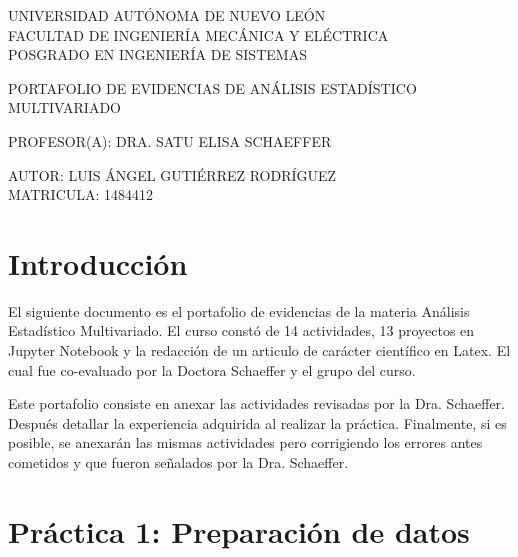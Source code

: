 \documentclass[12pt, letter]{report}
\begin{document}
	
\begin{titlepage}	
	\begin{center}
		\huge UNIVERSIDAD AUTÓNOMA DE NUEVO LEÓN\\
		\bigskip
		\bigskip
		FACULTAD DE INGENIERÍA MECÁNICA Y ELÉCTRICA\\
		\bigskip
		\bigskip
		POSGRADO EN INGENIERÍA DE SISTEMAS\\
		\bigskip
		\bigskip
		\bigskip
		\bigskip
		\begin{Large}
			PORTAFOLIO DE EVIDENCIAS DE ANÁLISIS ESTADÍSTICO MULTIVARIADO\\
		\end{Large}
		\bigskip
		\bigskip
		\begin{large}
		\bigskip
			PROFESOR(A): DRA. SATU ELISA SCHAEFFER\\
		\bigskip
		\end{large}
		\bigskip
		\bigskip
		\bigskip
		\begin{large}
			AUTOR: LUIS ÁNGEL GUTIÉRREZ RODRÍGUEZ\\
			MATRICULA: 1484412\\
		\end{large}
	\end{center}	
\end{titlepage}	





\chapter*{Introducción}

El siguiente documento es el portafolio de evidencias de la materia Análisis Estadístico Multivariado. El curso constó de 14 actividades, 13 proyectos en Jupyter Notebook y la redacción de un articulo de carácter científico en Latex. El cual fue co-evaluado por la Doctora Schaeffer y el grupo del curso.

Este portafolio consiste en anexar las actividades revisadas por la Dra. Schaeffer. Después detallar la experiencia adquirida al realizar la práctica. Finalmente, si es posible, se anexarán las mismas actividades pero corrigiendo los errores antes cometidos y que fueron señalados por la Dra. Schaeffer.


\newpage

\chapter*{Práctica 1: Preparación de datos}

\end{document}

